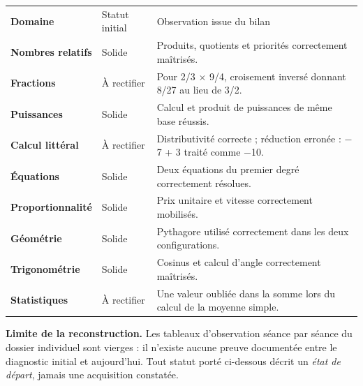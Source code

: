 \documentclass[10pt,a4paper]{article}
\begin{document}
\par\noindent\begin{tabularx}{\linewidth}{>{\bfseries}p{32mm} p{28mm} X}
\rowcolor{Navy}\color{white}Domaine & \color{white}Statut initial & \color{white}Observation issue du bilan \\
Nombres relatifs & Solide & Produits, quotients et priorités correctement maîtrisés. \\
Fractions & À rectifier & Pour 2/3 $\times$ 9/4, croisement inversé donnant 8/27 au lieu de 3/2. \\
Puissances & Solide & Calcul et produit de puissances de même base réussis. \\
Calcul littéral & À rectifier & Distributivité correcte ; réduction erronée : $-$7 + 3 traité comme $-$10. \\
Équations & Solide & Deux équations du premier degré correctement résolues. \\
Proportionnalité & Solide & Prix unitaire et vitesse correctement mobilisés. \\
Géométrie & Solide & Pythagore utilisé correctement dans les deux configurations. \\
Trigonométrie & Solide & Cosinus et calcul d'angle correctement maîtrisés. \\
Statistiques & À rectifier & Une valeur oubliée dans la somme lors du calcul de la moyenne simple. \\
\end{tabularx}
\begin{warningbox}\textbf{Limite de la reconstruction.} Les tableaux d'observation séance par séance du dossier individuel sont vierges : il n'existe aucune preuve documentée entre le diagnostic initial et aujourd'hui. Tout statut porté ci-dessous décrit un \emph{état de départ}, jamais une acquisition constatée.\end{warningbox}
\newpage{}
\end{document}
